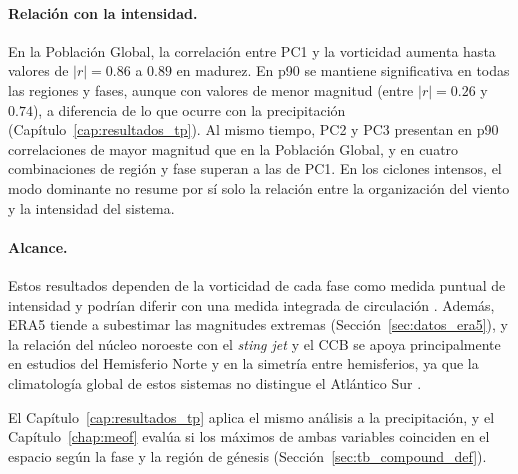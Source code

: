 \paragraph{Relación con la intensidad.}
En la Población Global, la correlación entre PC1 y la vorticidad aumenta hasta valores de $|r|=0.86$ a $0.89$ en madurez. En p90 se mantiene significativa en todas las regiones y fases, aunque con valores de menor magnitud (entre $|r|=0.26$ y $0.74$), a diferencia de lo que ocurre con la precipitación (Capítulo~\ref{cap:resultados_tp}). Al mismo tiempo, PC2 y PC3 presentan en p90 correlaciones de mayor magnitud que en la Población Global, y en cuatro combinaciones de región y fase superan a las de PC1. En los ciclones intensos, el modo dominante no resume por sí solo la relación entre la organización del viento y la intensidad del sistema.

\paragraph{Alcance.}
Estos resultados dependen de la vorticidad de cada fase como medida puntual de intensidad y podrían diferir con una medida integrada de circulación \citep{sinclair1997objective}. Además, ERA5 tiende a subestimar las magnitudes extremas (Sección~\ref{sec:datos_era5}), y la relación del núcleo noroeste con el \textit{sting jet} y el CCB se apoya principalmente en estudios del Hemisferio Norte y en la simetría entre hemisferios, ya que la climatología global de estos sistemas no distingue el Atlántico Sur \citep{gray2024global}.

El Capítulo~\ref{cap:resultados_tp} aplica el mismo análisis a la precipitación, y el Capítulo~\ref{chap:meof} evalúa si los máximos de ambas variables coinciden en el espacio según la fase y la región de génesis (Sección~\ref{sec:tb_compound_def}).
